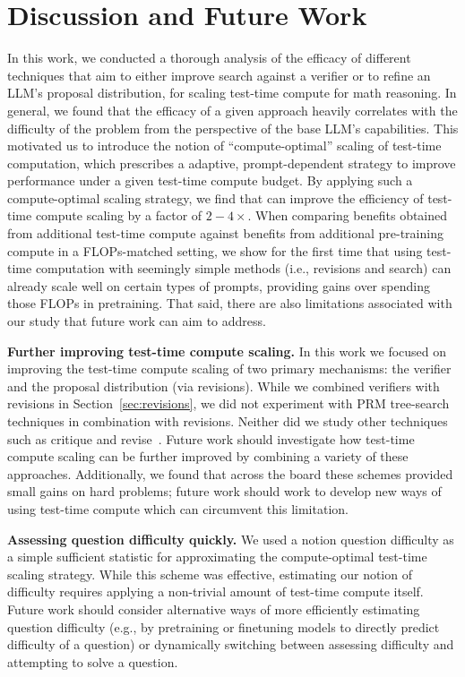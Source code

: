 \vspace{-0.2cm}
\section{Discussion and Future Work}
\label{sec:discussion}
\vspace{-0.2cm}

In this work, we conducted a thorough analysis of the efficacy of different techniques that aim to either improve search against a verifier or to refine an LLM's proposal distribution, for scaling test-time compute for math reasoning. In general, we found that the efficacy of a given approach heavily correlates with the difficulty of the problem from the perspective of the base LLM's capabilities. This motivated us to introduce the notion of ``compute-optimal'' scaling of test-time computation, which prescribes a adaptive, prompt-dependent strategy to improve performance under a given test-time compute budget. By applying such a compute-optimal scaling strategy, we find that can improve the efficiency of test-time compute scaling by a factor of \textbf{$2-4\times$}. When comparing benefits obtained from additional test-time compute against benefits from additional pre-training compute in a FLOPs-matched setting, we show for the first time that using test-time computation with seemingly simple methods (i.e., revisions and search) can already scale well on certain types of prompts, providing gains over spending those FLOPs in pretraining. That said, there are also limitations associated with our study that future work can aim to address. 

\textbf{Further improving test-time compute scaling.} In this work we focused on improving the test-time compute scaling of two primary mechanisms: the verifier and the proposal distribution (via revisions). While we combined verifiers with revisions in Section~\ref{sec:revisions}, we did not experiment with PRM tree-search techniques in combination with revisions. Neither did we study other techniques such as critique and revise~\citep{madaan2023selfrefine}. Future work should investigate how test-time compute scaling can be further improved by combining a variety of these approaches. Additionally, we found that across the board these schemes provided small gains on hard problems; future work should work to develop new ways of using test-time compute which can circumvent this limitation.

\textbf{Assessing question difficulty quickly.} We used a notion question difficulty as a simple sufficient statistic for approximating the compute-optimal test-time scaling strategy. While this scheme was effective, estimating our notion of difficulty requires applying a non-trivial amount of test-time compute itself. Future work should consider alternative ways of more efficiently estimating question difficulty (e.g., by pretraining or finetuning models to directly predict difficulty of a question) or dynamically switching between assessing difficulty and attempting to solve a question.

